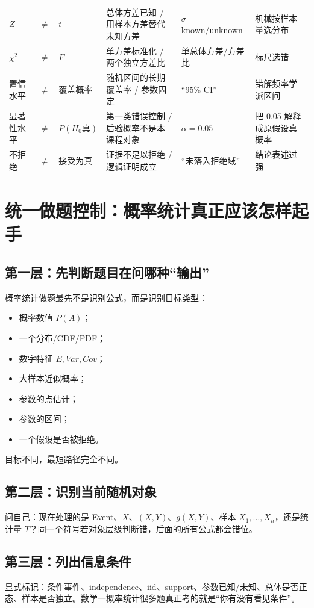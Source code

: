 \documentclass[11pt,a4paper,openany]{ctexbook}
\begin{document}
\begin{longtable}{L{2.2cm}@{}>{\centering\arraybackslash}p{0.5cm}@{}L{2.2cm}L{4.2cm}L{4.2cm}L{\dimexpr\linewidth-13.9cm\relax}}
$Z$ & $\neq$ & $t$ & 总体方差已知 / 用样本方差替代未知方差 & $\sigma$ known/unknown & 机械按样本量选分布\\
$\chi^2$ & $\neq$ & $F$ & 单方差标准化 / 两个独立方差比 & 单总体方差/方差比 & 标尺选错\\
置信水平 & $\neq$ & 覆盖概率 & 随机区间的长期覆盖率 / 参数固定 & “95\% CI” & 错解频率学派区间\\
显著性水平 & $\neq$ & $P(H_0\text{真})$ & 第一类错误控制 / 后验概率不是本课程对象 & $\alpha=0.05$ & 把 0.05 解释成原假设真概率\\
不拒绝 & $\neq$ & 接受为真 & 证据不足以拒绝 / 逻辑证明成立 & “未落入拒绝域” & 结论表述过强\\
\bottomrule
\end{longtable}

\chapter{统一做题控制：概率统计真正应该怎样起手}

\section{第一层：先判断题目在问哪种“输出”}
概率统计做题最先不是识别公式，而是识别目标类型：
\begin{itemize}
  \item 概率数值 $P(A)$；
  \item 一个分布/CDF/PDF；
  \item 数字特征 $E,Var,Cov$；
  \item 大样本近似概率；
  \item 参数的点估计；
  \item 参数的区间；
  \item 一个假设是否被拒绝。
\end{itemize}
目标不同，最短路径完全不同。

\section{第二层：识别当前随机对象}
问自己：现在处理的是 Event、$X$、$(X,Y)$、$g(X,Y)$、样本 $X_1,\dots,X_n$，还是统计量 $T$？同一个符号若对象层级判断错，后面的所有公式都会错位。

\section{第三层：列出信息条件}
显式标记：条件事件、independence、iid、support、参数已知/未知、总体是否正态、样本是否独立。数学一概率统计很多题真正考的就是“你有没有看见条件”。
\end{document}
